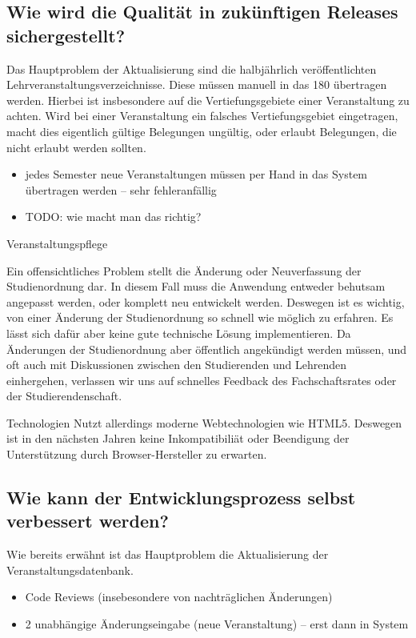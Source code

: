 \documentclass[ngerman]{article}
\begin{document}
\subsection{Wie wird die Qualität in zukünftigen Releases sichergestellt?}

Das Hauptproblem der Aktualisierung sind die halbjährlich veröffentlichten Lehrveranstaltungsverzeichnisse.
Diese müssen manuell in das 180 übertragen werden.
Hierbei ist insbesondere auf die Vertiefungsgebiete einer Veranstaltung zu achten.
Wird bei einer Veranstaltung ein falsches Vertiefungsgebiet eingetragen, macht dies eigentlich gültige Belegungen ungültig, oder erlaubt Belegungen, die nicht erlaubt werden sollten.

\begin{itemize}
    \item
        jedes Semester neue Veranstaltungen müssen per Hand in das System übertragen werden -- sehr fehleranfällig
    \item
        TODO: wie macht man das richtig?
\end{itemize}

Veranstaltungspflege

Ein offensichtliches Problem stellt die Änderung oder Neuverfassung der
Studienordnung dar. In diesem Fall muss die Anwendung entweder behutsam
angepasst werden, oder komplett neu entwickelt werden. Deswegen ist es
wichtig, von einer Änderung der Studienordnung so schnell wie möglich zu
erfahren. Es lässt sich dafür aber keine gute technische Lösung
implementieren. Da Änderungen der Studienordnung aber öffentlich
angekündigt werden müssen, und oft auch mit Diskussionen zwischen den
Studierenden und Lehrenden einhergehen, verlassen wir uns auf schnelles
Feedback des Fachschaftsrates oder der Studierendenschaft.

Technologien Nutzt allerdings moderne Webtechnologien wie HTML5.
Deswegen ist in den nächsten Jahren keine Inkompatibiliät oder
Beendigung der Unterstützung durch Browser-Hersteller zu erwarten.

\subsection{Wie kann der Entwicklungsprozess selbst verbessert werden?}

Wie bereits erwähnt ist das Hauptproblem die Aktualisierung der
Veranstaltungsdatenbank.

\begin{itemize}
    \item
        Code Reviews (insebesondere von nachträglichen Änderungen)
    \item
        2 unabhängige Änderungseingabe (neue Veranstaltung) -- erst dann in System
\end{itemize}
\end{document}
